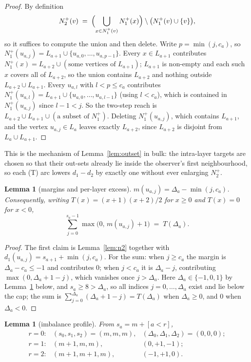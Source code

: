 \documentclass[11pt]{amsart}
\newtheorem{lemma}[theorem]{Lemma}
\theoremstyle{remark}
\begin{document}
\begin{proof}
By definition
\[
N_2^+(v) \;=\; \Bigl(\bigcup_{x \in N_1^+(v)} N_1^+(x)\Bigr)
  \setminus \bigl(N_1^+(v) \cup \{v\}\bigr),
\]
so it suffices to compute the union and then delete. Write $p = \min(j, c_a)$,
so $N_1^+(u_{a,j}) = L_{a+1} \cup \{u_{a,0}, \dots, u_{a,p-1}\}$. Every $x \in L_{a+1}$ contributes
$N_1^+(x) = L_{a+2} \cup (\text{some vertices of } L_{a+1})$; $L_{a+1}$ is
non-empty and each such $x$ covers all of $L_{a+2}$, so the union contains
$L_{a+2}$ and nothing outside $L_{a+2} \cup L_{a+1}$. Every $u_{a,l}$ with
$l < p \le c_a$ contributes
$N_1^+(u_{a,l}) = L_{a+1} \cup \{u_{a,0}, \dots, u_{a,l-1}\}$ (using
$l < c_a$), which is contained in $N_1^+(u_{a,j})$ since $l - 1 < j$. So the
two-step reach is $L_{a+2} \cup L_{a+1} \cup (\text{a subset of } N_1^+)$.
Deleting $N_1^+(u_{a,j})$, which contains $L_{a+1}$, and the vertex
$u_{a,j} \in L_a$ leaves exactly $L_{a+2}$, since $L_{a+2}$ is disjoint from
$L_a \cup L_{a+1}$.
\end{proof}

This is the mechanism of Lemma~\ref{lem:outset} in bulk: the intra-layer
targets are chosen so that their out-sets already lie inside the observer's
first neighbourhood, so each (T) arc lowers $d_1 - d_2$ by exactly one without
ever enlarging $N_2^+$.

\begin{lemma}[margins and per-layer excess]\label{lem:layer}
$m(u_{a,j}) = \Delta_a - \min(j, c_a)$. Consequently, writing
$T(x) = (x+1)(x+2)/2$ for $x \ge 0$ and $T(x) = 0$ for $x < 0$,
\[
\sum_{j=0}^{s_a - 1} \max\bigl(0,\, m(u_{a,j}) + 1\bigr) \;=\; T(\Delta_a).
\]
\end{lemma}

\begin{proof}
The first claim is Lemma~\ref{lem:n2} together with
$d_1(u_{a,j}) = s_{a+1} + \min(j, c_a)$. For the sum: when $j \ge c_a$ the
margin is $\Delta_a - c_a \le -1$ and contributes $0$; when $j < c_a$ it is
$\Delta_a - j$, contributing $\max(0, \Delta_a + 1 - j)$, which vanishes once
$j > \Delta_a$. Here $\Delta_a \in \{-1,0,1\}$ by Lemma~\ref{lem:profile}
below, and $s_a \ge 8 > \Delta_a$, so all indices $j = 0, \dots, \Delta_a$
exist and lie below the cap; the sum is
$\sum_{j=0}^{\Delta_a}(\Delta_a + 1 - j) = T(\Delta_a)$ when $\Delta_a \ge 0$,
and $0$ when $\Delta_a < 0$.
\end{proof}

\begin{lemma}[imbalance profile]\label{lem:profile}
From $s_a = m + [a < r]$,
\[
\begin{array}{llll}
r = 0: & (s_0,s_1,s_2) = (m,m,m), &
  (\Delta_0,\Delta_1,\Delta_2) = (0,0,0);\\
r = 1: & (m{+}1,m,m), & (0,+1,-1);\\
r = 2: & (m{+}1,m{+}1,m), & (-1,+1,0).
\end{array}
\]
\end{lemma}
\end{document}
